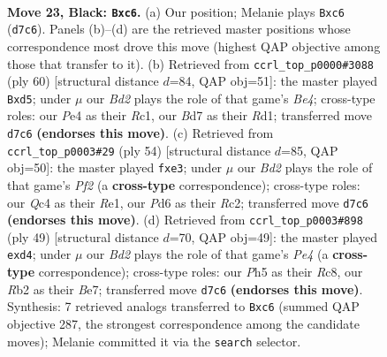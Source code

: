 \documentclass[11pt]{article}
\begin{document}
\clearpage

\begin{figure}[p]\centering
\begin{subfigure}{0.46\textwidth}\centering
\resizebox{\linewidth}{!}{%
\newchessgame
\chessboard[
  setfen={5rk1/p2b1pb1/2Np4/7p/P1q1p2P/8/1r3BK1/R2Q3R b - - 0 23},
  showmover=false,
  pgfstyle=straightmove, color=movearrow, markmove={d7-c6}
]}
\caption{}
\end{subfigure}\hfill
\begin{subfigure}{0.46\textwidth}\centering
\resizebox{\linewidth}{!}{%
\newchessgame
\chessboard[
  setfen={1r1r2k1/5pp1/3q3p/p2n4/4B3/4b2P/Q4PP1/2RR2K1 w - - 0 31},
  showmover=false,
  pgfstyle=straightmove, color=movearrow, markmove={e4-d5}
]}
\caption{}
\end{subfigure}
\\[4pt]
\begin{subfigure}{0.46\textwidth}\centering
\resizebox{\linewidth}{!}{%
\newchessgame
\chessboard[
  setfen={1r5k/3b2pp/3p4/1Pq1r3/2B1p3/1Q2b3/2R2PPP/4R1K1 w - - 0 28},
  showmover=false,
  pgfstyle=straightmove, color=movearrow, markmove={f2-e3}
]}
\caption{}
\end{subfigure}\hfill
\begin{subfigure}{0.46\textwidth}\centering
\resizebox{\linewidth}{!}{%
\newchessgame
\chessboard[
  setfen={2r1r1k1/4b1p1/3qp3/1p2p1B1/1P1NP3/1Q6/5PP1/R3R1K1 b - - 0 25},
  showmover=false,
  pgfstyle=straightmove, color=movearrow, markmove={e5-d4}
]}
\caption{}
\end{subfigure}
\caption{\textbf{Move 23, Black: \texttt{Bxc6}.} (a) Our position; Melanie plays \texttt{Bxc6} (\texttt{d7c6}). Panels (b)--(d) are the retrieved master positions whose correspondence most drove this move (highest QAP objective among those that transfer to it). (b) Retrieved from \texttt{ccrl\_top\_p0000\#3088} (ply 60) [structural distance $d$=84, QAP obj=51]: the master played \texttt{Bxd5}; under $\mu$ our \emph{Bd2} plays the role of that game's \emph{Be4}; cross-type roles: our \emph{P}e4 as their \emph{R}c1, our \emph{B}d7 as their \emph{R}d1; transferred move \texttt{d7c6} \textbf{(endorses this move)}. (c) Retrieved from \texttt{ccrl\_top\_p0003\#29} (ply 54) [structural distance $d$=85, QAP obj=50]: the master played \texttt{fxe3}; under $\mu$ our \emph{Bd2} plays the role of that game's \emph{Pf2} (a \textbf{cross-type} correspondence); cross-type roles: our \emph{Q}c4 as their \emph{R}e1, our \emph{P}d6 as their \emph{R}c2; transferred move \texttt{d7c6} \textbf{(endorses this move)}. (d) Retrieved from \texttt{ccrl\_top\_p0003\#898} (ply 49) [structural distance $d$=70, QAP obj=49]: the master played \texttt{exd4}; under $\mu$ our \emph{Bd2} plays the role of that game's \emph{Pe4} (a \textbf{cross-type} correspondence); cross-type roles: our \emph{P}h5 as their \emph{R}c8, our \emph{R}b2 as their \emph{B}e7; transferred move \texttt{d7c6} \textbf{(endorses this move)}. Synthesis: 7 retrieved analogs transferred to \texttt{Bxc6} (summed QAP objective 287, the strongest correspondence among the candidate moves); Melanie committed it via the \texttt{search} selector.}
\label{fig:thought-m45}
\end{figure}
\end{document}

